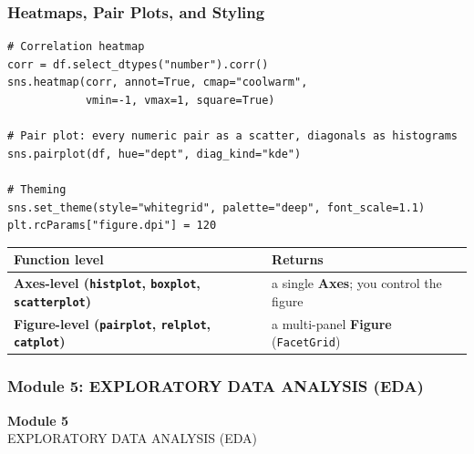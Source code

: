 \documentclass[aspectratio=169,10pt]{beamer}
\newcommand{\keyword}[1]{\textcolor{PrimaryBlue}{\textbf{#1}}}
\newcommand{\codeword}[1]{\texttt{#1}}
\begin{document}
\begin{frame}[fragile]
\frametitle{Heatmaps, Pair Plots, and Styling}
\small
\begin{lstlisting}[style=pycode]
# Correlation heatmap
corr = df.select_dtypes("number").corr()
sns.heatmap(corr, annot=True, cmap="coolwarm",
            vmin=-1, vmax=1, square=True)

# Pair plot: every numeric pair as a scatter, diagonals as histograms
sns.pairplot(df, hue="dept", diag_kind="kde")

# Theming
sns.set_theme(style="whitegrid", palette="deep", font_scale=1.1)
plt.rcParams["figure.dpi"] = 120
\end{lstlisting}

\renewcommand{\arraystretch}{1.20}
\begin{tabularx}{\linewidth}{>{\bfseries}p{3.4cm}X}
\toprule
Function level & Returns \\
\midrule
Axes-level (\codeword{histplot}, \codeword{boxplot}, \codeword{scatterplot}) & a single \keyword{Axes}; you control the figure \\
Figure-level (\codeword{pairplot}, \codeword{relplot}, \codeword{catplot}) & a multi-panel \keyword{Figure} (\codeword{FacetGrid}) \\
\bottomrule
\end{tabularx}
\end{frame}


\begin{noheadline}
\begin{frame}
\frametitle{Module 5: EXPLORATORY DATA ANALYSIS (EDA)}
\vspace{1.2cm}
\begin{center}
  {\fontsize{30}{36}\selectfont\textbf{Module 5}}\\[0.35cm]
  {\fontsize{22}{28}\selectfont EXPLORATORY DATA ANALYSIS (EDA)}\\[0.7cm]
\end{center}
\end{frame}
\end{noheadline}
\end{document}
